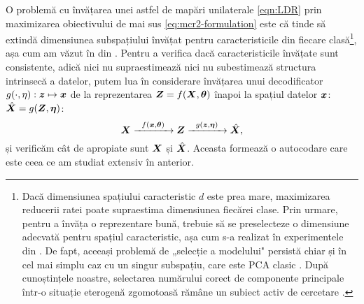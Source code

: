 \documentclass[../../book-main_ro.tex]{subfiles}
\begin{document}
O problemă cu învățarea unei astfel de mapări unilaterale \eqref{eqn:LDR} prin maximizarea obiectivului de mai sus \eqref{eq:mcr2-formulation} este că tinde să extindă dimensiunea subspațiului învățat pentru caracteristicile din fiecare clasă\footnote{Dacă dimensiunea spațiului caracteristic $d$ este prea mare, maximizarea reducerii ratei poate supraestima dimensiunea fiecărei clase. Prin urmare, pentru a învăța o reprezentare bună, trebuie să se preselecteze o dimensiune adecvată pentru spațiul caracteristic, așa cum s-a realizat în experimentele din \cite{yu2020learning}. De fapt, aceeași problemă de „selecție a modelului" persistă chiar și în cel mai simplu caz cu un singur subspațiu, care este PCA clasic \cite{Jolliffe1986}. După cunoștințele noastre, selectarea numărului corect de componente principale într-o situație eterogenă zgomotoasă rămâne un subiect activ de cercetare \cite{hong2020selecting}.}, așa cum am văzut în  din . Pentru a verifica dacă caracteristicile învățate sunt consistente, adică nici nu supraestimează nici nu subestimează structura intrinsecă a datelor, putem lua în considerare învățarea unui decodificator $g(\cdot,\eta): \bm{z} \mapsto  \bm{x}$ de la reprezentarea $\bm{Z} = f(\bm{X},\bm\theta)$ înapoi la spațiul datelor $\bm{x}$: $\hat {\bm{X}} = g(\bm{Z}, \bm\eta)$:
\begin{equation}
    \bm{X} \xrightarrow{\hspace{2mm} f(\bm{x}, \bm\theta)\hspace{2mm}} \bm{Z} \xrightarrow{\hspace{2mm} g(\bm{z}, \bm \eta) \hspace{2mm}} \hat {\bm{X}},
    \label{eqn:autoencoding-ch6}
\end{equation}
și verificăm cât de apropiate sunt $\bm{X}$ și $\hat {\bm{X}}$. Aceasta formează o autocodare care este ceea ce am studiat extensiv în  anterior.
\end{document}
